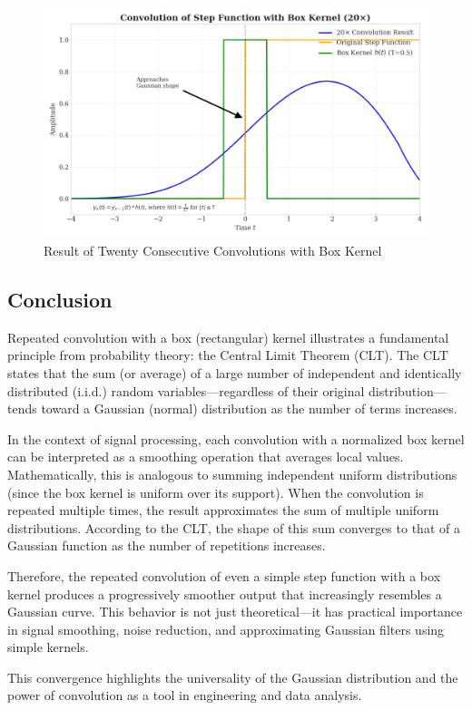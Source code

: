 \documentclass{article}
\begin{document}
\begin{figure}[H]
\centering
\includegraphics[width=1\textwidth]{figs/20_repeation.png}
\caption{Result of Twenty Consecutive Convolutions with Box Kernel}
\end{figure}

\subsection*{Conclusion}

Repeated convolution with a box (rectangular) kernel illustrates a fundamental principle from probability theory: the Central Limit Theorem (CLT). The CLT states that the sum (or average) of a large number of independent and identically distributed (i.i.d.) random variables—regardless of their original distribution—tends toward a Gaussian (normal) distribution as the number of terms increases.

In the context of signal processing, each convolution with a normalized box kernel can be interpreted as a smoothing operation that averages local values. Mathematically, this is analogous to summing independent uniform distributions (since the box kernel is uniform over its support). When the convolution is repeated multiple times, the result approximates the sum of multiple uniform distributions. According to the CLT, the shape of this sum converges to that of a Gaussian function as the number of repetitions increases.

Therefore, the repeated convolution of even a simple step function with a box kernel produces a progressively smoother output that increasingly resembles a Gaussian curve. This behavior is not just theoretical—it has practical importance in signal smoothing, noise reduction, and approximating Gaussian filters using simple kernels.

This convergence highlights the universality of the Gaussian distribution and the power of convolution as a tool in engineering and data analysis.
\end{document}
